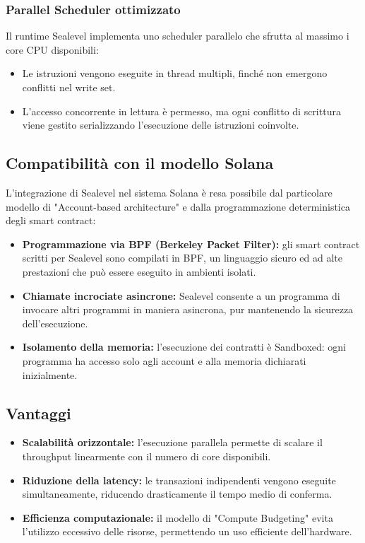 \documentclass[a4paper,12pt]{report}
\begin{document}
	\subsubsection{Parallel Scheduler ottimizzato}
	Il runtime Sealevel implementa uno scheduler parallelo che sfrutta al massimo i core CPU disponibili:
	\begin{itemize}
		\item Le istruzioni vengono eseguite in thread multipli, finché non emergono conflitti nel write set.
		\item L’accesso concorrente in lettura è permesso, ma ogni conflitto di scrittura viene gestito serializzando l’esecuzione delle istruzioni coinvolte.
	\end{itemize}
	
	\subsection{Compatibilità con il modello Solana}
	L’integrazione di Sealevel nel sistema Solana è resa possibile dal particolare modello di "Account-based architecture" e dalla programmazione deterministica degli smart contract:
	
	\begin{itemize}
		\item \textbf{Programmazione via BPF (Berkeley Packet Filter):} gli smart contract scritti per Sealevel sono compilati in BPF, un linguaggio sicuro ed ad alte prestazioni che può essere eseguito in ambienti isolati.
		\item \textbf{Chiamate incrociate asincrone:} Sealevel consente a un programma di invocare altri programmi in maniera asincrona, pur mantenendo la sicurezza dell’esecuzione.
		\item \textbf{Isolamento della memoria:} l’esecuzione dei contratti è Sandboxed: ogni programma ha accesso solo agli account e alla memoria dichiarati inizialmente.
	\end{itemize}
	
	\subsection{Vantaggi}
	\begin{itemize}
		\item \textbf{Scalabilità orizzontale:} l’esecuzione parallela permette di scalare il throughput linearmente con il numero di core disponibili.
		\item \textbf{Riduzione della latency:} le transazioni indipendenti vengono eseguite simultaneamente, riducendo drasticamente il tempo medio di conferma.
		\item \textbf{Efficienza computazionale:} il modello di "Compute Budgeting" evita l’utilizzo eccessivo delle risorse, permettendo un uso efficiente dell’hardware.
	\end{itemize}
	
\end{document}

